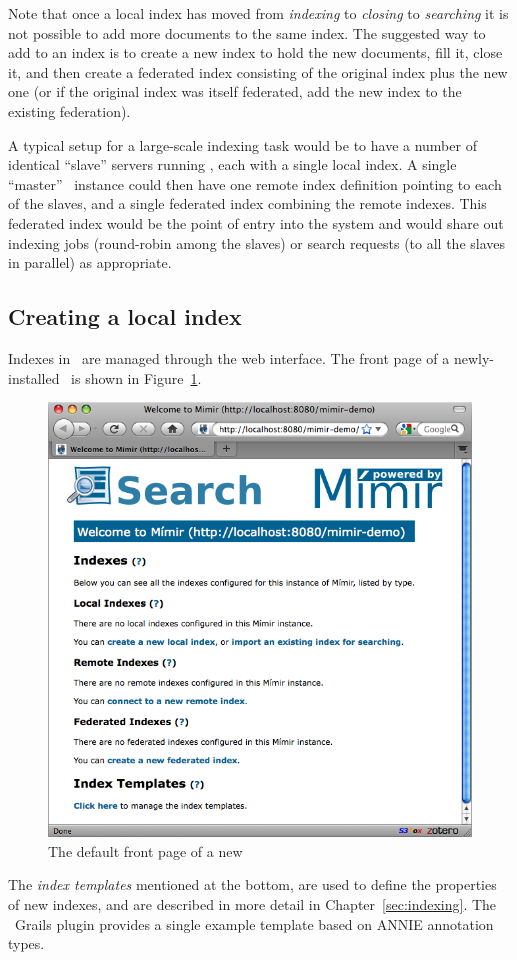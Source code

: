 Note that once a local index has moved from {\em indexing} to {\em closing} to
{\em searching} it is not possible to add more documents to the same index.
The suggested way to add to an index is to create a new index to hold the new
documents, fill it, close it, and then create a federated index consisting of
the original index plus the new one (or if the original index was itself
federated, add the new index to the existing federation).

A typical setup for a large-scale indexing task would be to have a number of
identical ``slave'' servers running \Mimir, each with a single local index.  A
single ``master'' \Mimir\ instance could then have one remote index definition
pointing to each of the slaves, and a single federated index combining the
remote indexes.  This federated index would be the point of entry into the
system and would share out indexing jobs (round-robin among the slaves) or
search requests (to all the slaves in parallel) as appropriate.

\subsection{Creating a local index}

Indexes in \Mimir\ are managed through the web interface.  The front page of a
newly-installed \Mimir\ is shown in Figure~\ref{fig:front-page}.
%
\begin{figure}[htb!]
\begin{center}
\includegraphics[scale=0.5]{img/default-front-page}
\end{center}
\caption{The default front page of a new \Mimir}
\label{fig:front-page}
\end{figure}
%
The {\em index templates} mentioned at the bottom, are used to define the
properties of new indexes, and are described in more detail in
Chapter~\ref{sec:indexing}.  The \Mimir\ Grails plugin provides a single
example template based on ANNIE annotation types.

